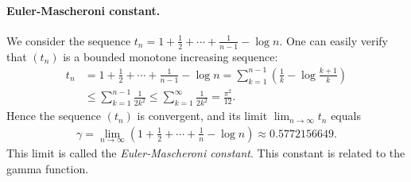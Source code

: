 \documentclass{article}
\numberwithin{equation}{section}
\theoremstyle{plain}
\theoremstyle{definition}
\begin{document}
\paragraph{Euler-Mascheroni constant.} We consider the sequence $t_n=1+\frac{1}{2}+\cdots+\frac{1}{n-1}-\log n$. One can easily verify that $(t_n)$ is a bounded monotone increasing sequence:
\begin{align*}
	t_n&=1+\frac{1}{2}+\cdots+\frac{1}{n-1}-\log n=\sum_{k=1}^{n-1}\left(\frac{1}{k}-\log\frac{k+1}{k}\right)\\
	&\leq\sum_{k=1}^{n-1}\frac{1}{2k^2}\leq\sum_{k=1}^\infty\frac{1}{2k^2}=\frac{\pi^2}{12}.
\end{align*}
Hence the sequence $(t_n)$ is convergent, and its limit $\lim_{n\to\infty}t_n$ equals
\begin{align*}
	\gamma=\lim_{n\to\infty}\left(1+\frac{1}{2}+\cdots+\frac{1}{n}-\log n\right)\approx 0.5772156649.
\end{align*}
This limit is called the \textit{Euler-Mascheroni constant}. This constant is related to the gamma function.
\end{document}
